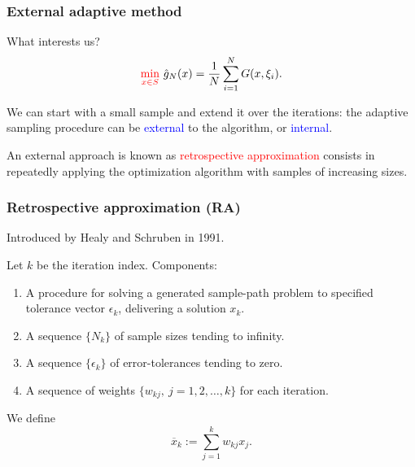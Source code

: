 \documentclass[aspectratio=169]{beamer}
\begin{document}
\begin{frame}
\frametitle{External adaptive method}

What interests us?
\[
\textcolor{red}{\min_{x \in S}}\ \hat{g}_N(x) = \frac{1}{N} \sum_{i = 1}^N G (x, \xi_i).
\]

\mbox{}

We can start with a small sample and extend it over the iterations:
the adaptive sampling procedure can be \textcolor{blue}{external} to the algorithm, or \textcolor{blue}{internal}.

\mbox{}

An external approach is known as \textcolor{red}{retrospective approximation} consists in repeatedly applying the optimization algorithm with samples of increasing sizes.

\end{frame}

\begin{frame}
\frametitle{Retrospective approximation (RA)}

Introduced by Healy and Schruben in 1991.

\mbox{}

Let $k$ be the iteration index. Components:
\begin{enumerate}
	\item 
	A procedure for solving a generated sample-path problem to specified tolerance vector $\epsilon_k$, delivering a solution $x_k$.
	\item
	A sequence $\{ N_k \}$ of sample sizes tending to infinity.
	\item
	A sequence $\{ \epsilon_k \}$ of error-tolerances tending to zero.
	\item
	A sequence of weights $\{ w_{kj},\ j = 1, 2,\ldots, k \}$ for each iteration.
\end{enumerate}

\mbox{}

We define
$$
\overline{x}_k := \sum_{j = 1}^k w_{kj} x_j.
$$
\end{frame}
\end{document}
